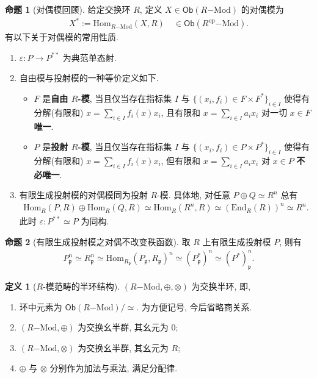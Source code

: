 \documentclass{MainStyle}
\theoremstyle{definition}
\theoremstyle{definition}
\theoremstyle{definition}
\newtheorem{definition}{定义}
\theoremstyle{definition}
\newtheorem{proposition}{命题}
\theoremstyle{definition}
\theoremstyle{definition}
\theoremstyle{definition}
\theoremstyle{remark}
\theoremstyle{remark}
\begin{document}
\begin{proposition}[对偶模回顾]
    给定交换环 $R$, 定义 $X\in \mathsf{Ob}(R\mathrm{-Mod})$ 的对偶模为
    \begin{align*}
        X^\ast:=\mathrm{Hom}_{R\mathrm{-Mod}}(X,R)\quad \in \mathsf{Ob}(R^{\mathrm{op}}\mathrm{-Mod}).
    \end{align*}
    有以下关于对偶模的常用性质.
    \begin{enumerate}
        \item $\varepsilon: P\to P^{\ast\ast}$ 为典范单态射.
        \item 自由模与投射模的一种等价定义如下.
              \begin{itemize}
                  \item $F$ 是\textbf{自由 $R$-模}, 当且仅当存在指标集 $I$ 与 $\{(x_i,f_i)\in F\times F^\ast\}_{i\in I}$ 使得有分解(有限和) $\displaystyle x=\sum _{i\in I}f_i(x)x_i$, 且有限和 $\displaystyle x=\sum _{i\in I}a_i x_i$ 对一切 $x\in F$ \textbf{唯一}.
                  \item $P$ 是\textbf{投射 $R$-模}, 当且仅当存在指标集 $I$ 与 $\{(x_i,f_i)\in P\times P^\ast\}_{i\in I}$ 使得有分解(有限和) $\displaystyle x=\sum _{i\in I}f_i(x)x_i$, 但有限和 $\displaystyle x=\sum _{i\in I}a_i x_i$ 对 $x\in P$ \textbf{不必唯一}.
              \end{itemize}
        \item 有限生成投射模的对偶模同为投射 $R$-模. 具体地, 对任意 $P\oplus Q\simeq R^n$ 总有
              \begin{align*}
                  \mathrm{Hom}_R(P,R)\oplus \mathrm{Hom}_R(Q,R)\simeq \mathrm{Hom}_R(R^n,R)\simeq (\mathrm{End}_R(R))^n\simeq R^n.
              \end{align*}
              此时 $\varepsilon: P^{\ast\ast}\simeq P$ 为同构.
    \end{enumerate}
\end{proposition}

\begin{proposition}[有限生成投射模之对偶不改变秩函数]
    取 $R$ 上有限生成投射模 $P$, 则有
    \begin{align*}
        P_\mathfrak p^n\simeq R_\mathfrak p^n\simeq \mathrm{Hom}_{R_\mathfrak p}(P_\mathfrak p,R_\mathfrak p)^n\simeq (P^\ast_\mathfrak p)^n\simeq (P^\ast)_\mathfrak p^n.
    \end{align*}
\end{proposition}

\begin{definition}[$R$-模范畴的半环结构]
    $(R\mathrm{-Mod},\oplus, \otimes)$ 为交换半环, 即,
    \begin{enumerate}
        \item 环中元素为 $\mathsf{Ob}(R\mathrm{-Mod})/\simeq$. 为方便记号, 今后省略商关系.
        \item $(R\mathrm{-Mod},\oplus)$ 为交换幺半群, 其幺元为 $0$;
        \item $(R\mathrm{-Mod}, \otimes)$ 为交换幺半群, 其幺元为 $R$;
        \item $\oplus$ 与 $\otimes$ 分别作为加法与乘法, 满足分配律.
    \end{enumerate}
\end{definition}
\end{document}
